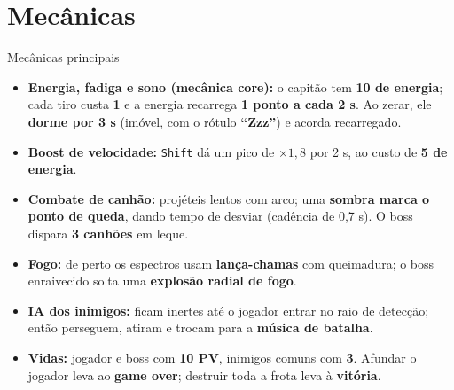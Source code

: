 \documentclass[aspectratio=169]{beamer}
\begin{document}
\section{Mec\^anicas}
\begin{frame}{Mec\^anicas principais}
  \begin{itemize}
    \item \textbf{Energia, fadiga e sono (mec\^anica core):} o capit\~ao tem
      \textbf{10 de energia}; cada tiro custa \textbf{1} e a energia recarrega
      \textbf{1 ponto a cada 2 s}. Ao zerar, ele \textbf{dorme por 3 s} (im\'ovel,
      com o r\'otulo \textbf{``Zzz''}) e acorda recarregado.
    \item \textbf{Boost de velocidade:} \texttt{Shift} d\'a um pico de
      $\times 1{,}8$ por 2 s, ao custo de \textbf{5 de energia}.
    \item \textbf{Combate de canh\~ao:} proj\'eteis lentos com arco; uma
      \textbf{sombra marca o ponto de queda}, dando tempo de desviar
      (cad\^encia de 0,7 s). O boss dispara \textbf{3 canh\~oes} em leque.
    \item \textbf{Fogo:} de perto os espectros usam \textbf{lan\c{c}a-chamas} com
      queimadura; o boss enraivecido solta uma \textbf{explos\~ao radial de fogo}.
    \item \textbf{IA dos inimigos:} ficam inertes at\'e o jogador entrar no raio de
      detec\c{c}\~ao; ent\~ao perseguem, atiram e trocam para a
      \textbf{m\'usica de batalha}.
    \item \textbf{Vidas:} jogador e boss com \textbf{10 PV}, inimigos comuns com
      \textbf{3}. Afundar o jogador leva ao \textbf{game over}; destruir toda a
      frota leva \`a \textbf{vit\'oria}.
  \end{itemize}
\end{frame}

\end{document}
